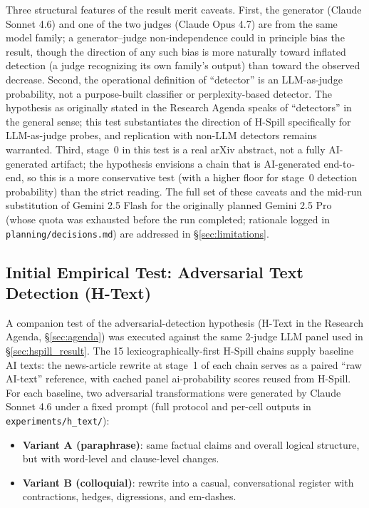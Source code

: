 \documentclass[12pt,a4paper]{article}
\begin{document}
Three structural features of the result merit caveats. First, the generator (Claude Sonnet 4.6) and one of the two judges (Claude Opus 4.7) are from the same model family; a generator--judge non-independence could in principle bias the result, though the direction of any such bias is more naturally toward inflated detection (a judge recognizing its own family's output) than toward the observed decrease. Second, the operational definition of ``detector'' is an LLM-as-judge probability, not a purpose-built classifier or perplexity-based detector. The hypothesis as originally stated in the Research Agenda speaks of ``detectors'' in the general sense; this test substantiates the direction of H-Spill specifically for LLM-as-judge probes, and replication with non-LLM detectors remains warranted. Third, stage~0 in this test is a real arXiv abstract, not a fully AI-generated artifact; the hypothesis envisions a chain that is AI-generated end-to-end, so this is a more conservative test (with a higher floor for stage~0 detection probability) than the strict reading. The full set of these caveats and the mid-run substitution of Gemini 2.5 Flash for the originally planned Gemini 2.5 Pro (whose quota was exhausted before the run completed; rationale logged in \texttt{planning/decisions.md}) are addressed in \S\ref{sec:limitations}.

\subsection{Initial Empirical Test: Adversarial Text Detection (H-Text)}
\label{sec:htext_result}

A companion test of the adversarial-detection hypothesis (H-Text in the Research Agenda, \S\ref{sec:agenda}) was executed against the same 2-judge LLM panel used in \S\ref{sec:hspill_result}. The 15 lexicographically-first H-Spill chains supply baseline AI texts: the news-article rewrite at stage~1 of each chain serves as a paired ``raw AI-text'' reference, with cached panel ai-probability scores reused from H-Spill. For each baseline, two adversarial transformations were generated by Claude Sonnet 4.6 under a fixed prompt (full protocol and per-cell outputs in \texttt{experiments/h\_text/}):

\begin{itemize}[leftmargin=*,itemsep=2pt]
\item \textbf{Variant A (paraphrase)}: same factual claims and overall logical structure, but with word-level and clause-level changes.
\item \textbf{Variant B (colloquial)}: rewrite into a casual, conversational register with contractions, hedges, digressions, and em-dashes.
\end{itemize}
\end{document}
